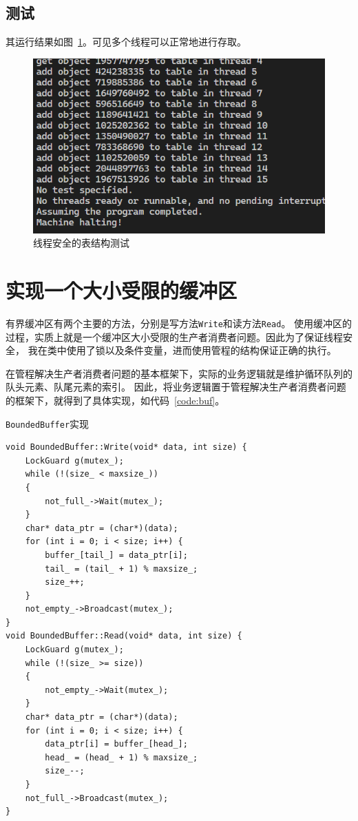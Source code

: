 \documentclass[a4paper,twoside]{article}
\begin{document}
\begin{spacing}{1.2}
\subsection{测试}

其运行结果如图~\ref{fig:tbl}。可见多个线程可以正常地进行存取。
\begin{figure}[htb]
	\centering
	\caption{线程安全的表结构测试}
	\label{fig:tbl}
	\includegraphics[width=0.4\linewidth]{tbl.png}
\end{figure}


\newpage

\section{实现一个大小受限的缓冲区}

有界缓冲区有两个主要的方法，分别是写方法\texttt{Write}和读方法\texttt{Read}。
使用缓冲区的过程，实质上就是一个缓冲区大小受限的生产者消费者问题。因此为了保证线程安全，
我在类中使用了锁以及条件变量，进而使用管程的结构保证正确的执行。

在管程解决生产者消费者问题的基本框架下，实际的业务逻辑就是维护循环队列的队头元素、队尾元素的索引。
因此，将业务逻辑置于管程解决生产者消费者问题的框架下，就得到了具体实现，如代码~\ref{code:buf}。

\begin{listing}[htb]
	\caption{\texttt{BoundedBuffer}实现}
	\label{code:buf}
	\begin{verbatim}
void BoundedBuffer::Write(void* data, int size) {
    LockGuard g(mutex_);
    while (!(size_ < maxsize_))
    {
        not_full_->Wait(mutex_);
    }
    char* data_ptr = (char*)(data);
    for (int i = 0; i < size; i++) {
        buffer_[tail_] = data_ptr[i];
        tail_ = (tail_ + 1) % maxsize_;
        size_++;
    }
    not_empty_->Broadcast(mutex_);
}
void BoundedBuffer::Read(void* data, int size) {
    LockGuard g(mutex_);
    while (!(size_ >= size))
    {
        not_empty_->Wait(mutex_);
    }
    char* data_ptr = (char*)(data);
    for (int i = 0; i < size; i++) {
        data_ptr[i] = buffer_[head_];
        head_ = (head_ + 1) % maxsize_;
        size_--;
    }
    not_full_->Broadcast(mutex_);
}
	\end{verbatim}
\end{listing}


\end{spacing}
\end{document}
